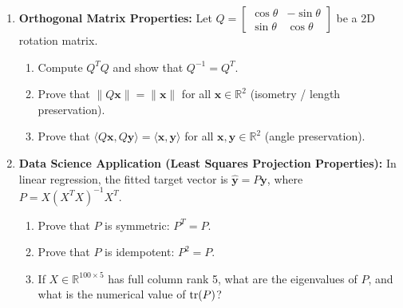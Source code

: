 \begin{enumerate}
\item \textbf{Orthogonal Matrix Properties:} Let $Q = \begin{bmatrix} \cos \theta & -\sin \theta \\ \sin \theta & \cos \theta \end{bmatrix}$ be a 2D rotation matrix.
\begin{enumerate}
    \item Compute $Q^T Q$ and show that $Q^{-1} = Q^T$.
    \item Prove that $\|Q \mathbf{x}\| = \|\mathbf{x}\|$ for all $\mathbf{x} \in \mathbb{R}^2$ (isometry / length preservation).
    \item Prove that $\langle Q\mathbf{x}, Q\mathbf{y} \rangle = \langle \mathbf{x}, \mathbf{y} \rangle$ for all $\mathbf{x}, \mathbf{y} \in \mathbb{R}^2$ (angle preservation).
\end{enumerate}

\item \textbf{Data Science Application (Least Squares Projection Properties):} In linear regression, the fitted target vector is $\hat{\mathbf{y}} = P \mathbf{y}$, where $P = X(X^T X)^{-1} X^T$.
\begin{enumerate}
    \item Prove that $P$ is symmetric: $P^T = P$.
    \item Prove that $P$ is idempotent: $P^2 = P$.
    \item If $X \in \mathbb{R}^{100 \times 5}$ has full column rank 5, what are the eigenvalues of $P$, and what is the numerical value of $\operatorname{tr}(P)$?
\end{enumerate}
\end{enumerate}


